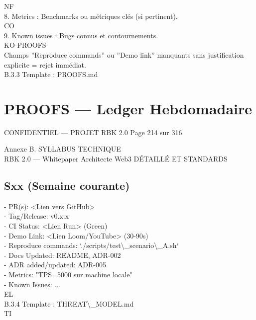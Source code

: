 \vspace{0.5em}
NF\\
8. Metrics : Benchmarks ou métriques clés (si pertinent).\\
CO\\
9. Known issues : Bugs connus et contournements.\\
\vspace{0.5em}
KO-PROOFS\\
Champs ”Reproduce commands” ou ”Demo link” manquants sans justification explicite = rejet immédiat.\\
\vspace{0.5em}
\vspace{0.5em}
B.3.3 Template : PROOFS.md\\
\section*{PROOFS --- Ledger Hebdomadaire}
\vspace{0.5em}
\vspace{0.5em}
\vspace{0.5em}
\vspace{0.5em}
\begin{confidential}CONFIDENTIEL — PROJET RBK 2.0                               Page 214 sur 316\end{confidential}
Annexe B. SYLLABUS TECHNIQUE\\
RBK 2.0 — Whitepaper Architecte Web3                                          DÉTAILLÉ ET STANDARDS\\
\vspace{0.5em}
\vspace{0.5em}
\vspace{0.5em}
\subsection*{Sxx (Semaine courante)}
- PR(s): \textless{}Lien vers GitHub\textgreater{}\\
- Tag/Release: v0.x.x\\
- CI Status: \textless{}Lien Run\textgreater{} (Green)\\
- Demo Link: \textless{}Lien Loom/YouTube\textgreater{} (30-90s)\\
- Reproduce commands: `./scripts/test\textbackslash{}_scenario\textbackslash{}_A.sh`\\
- Docs Updated: README, ADR-002\\
- ADR added/updated: ADR-005\\
- Metrics: "TPS=5000 sur machine locale"\\
- Known Issues: ...\\
\vspace{0.5em}
\vspace{0.5em}
\vspace{0.5em}
\vspace{0.5em}
EL\\
B.3.4 Template : THREAT\textbackslash{}_MODEL.md\\
\vspace{0.5em}
\vspace{0.5em}
\vspace{0.5em}
\vspace{0.5em}
TI\\
